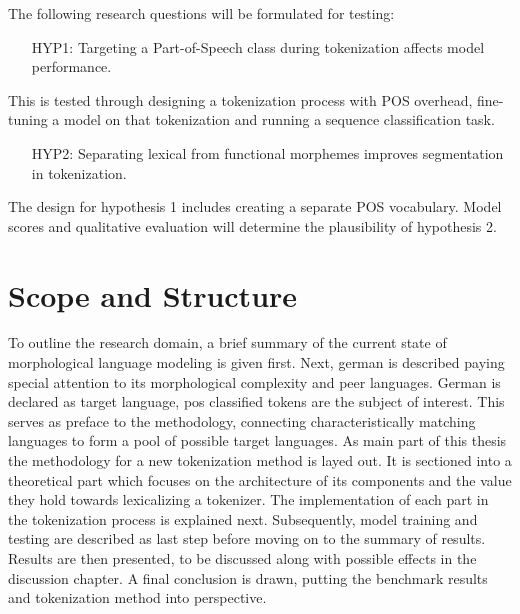 \centerline{The following research questions will be formulated for testing:}
\begin{framed}
    \hypertarget{hyp1}{}
    \begin{itemize}[itemindent=1em]
        \item[HYP1:] Targeting a Part-of-Speech class during tokenization affects model performance.
    \end{itemize}
\end{framed}
\noindent This is tested through designing a tokenization process with POS overhead, fine-tuning a model on that tokenization and running a sequence classification task.
\begin{framed}
    \hypertarget{hyp2}{}
    \begin{itemize}[itemindent=1em]
        \item[HYP2:] Separating lexical from functional morphemes improves segmentation in tokenization.
    \end{itemize}
\end{framed}
\noindent The design for hypothesis 1 includes creating a separate POS vocabulary.
Model scores and qualitative evaluation will determine the plausibility of hypothesis 2.

\section{Scope and Structure}
\label{sec:scope-and-structure}

To outline the research domain, a brief summary of the current state of morphological language modeling is given first.
Next, german is described paying special attention to its morphological complexity and peer languages.
German is declared as target language, \ac{pos} classified tokens are the subject of interest.
This serves as preface to the methodology, connecting characteristically matching languages to form a pool of possible  target languages.
As main part of this thesis the methodology for a new tokenization method is layed out.
It is sectioned into a theoretical part which focuses on the architecture of its components and the value they hold towards lexicalizing a tokenizer.
The implementation of each part in the tokenization process is explained next.
Subsequently, model training and testing are described as last step before moving on to the summary of results.
Results are then presented, to be discussed along with possible effects in the discussion chapter.
A final conclusion is drawn, putting the benchmark results and tokenization method into perspective.
